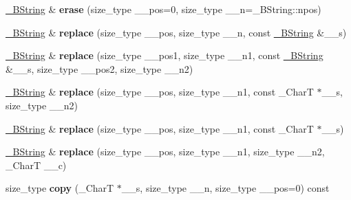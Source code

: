 \begin{DoxyCompactItemize}
\hyperlink{classbasic__string}{\+\_\+\+B\+String} \& {\bfseries erase} (size\+\_\+type \+\_\+\+\_\+pos=0, size\+\_\+type \+\_\+\+\_\+n=\+\_\+\+B\+String\+::npos)
\item 
\mbox{\label{class____bstr__sum_ae89e9ce3af93bc26c42b4db0bb301c82}} 
\hyperlink{classbasic__string}{\+\_\+\+B\+String} \& {\bfseries replace} (size\+\_\+type \+\_\+\+\_\+pos, size\+\_\+type \+\_\+\+\_\+n, const \hyperlink{classbasic__string}{\+\_\+\+B\+String} \&\+\_\+\+\_\+s)
\item 
\mbox{\label{class____bstr__sum_afd33aa7b835a24a603141171bce557f8}} 
\hyperlink{classbasic__string}{\+\_\+\+B\+String} \& {\bfseries replace} (size\+\_\+type \+\_\+\+\_\+pos1, size\+\_\+type \+\_\+\+\_\+n1, const \hyperlink{classbasic__string}{\+\_\+\+B\+String} \&\+\_\+\+\_\+s, size\+\_\+type \+\_\+\+\_\+pos2, size\+\_\+type \+\_\+\+\_\+n2)
\item 
\mbox{\label{class____bstr__sum_abdd6e076f57d44a71cd7277f724df418}} 
\hyperlink{classbasic__string}{\+\_\+\+B\+String} \& {\bfseries replace} (size\+\_\+type \+\_\+\+\_\+pos, size\+\_\+type \+\_\+\+\_\+n1, const \+\_\+\+CharT $\ast$\+\_\+\+\_\+s, size\+\_\+type \+\_\+\+\_\+n2)
\item 
\mbox{\label{class____bstr__sum_a5131eb6d7ba966b682341bb4ed85373a}} 
\hyperlink{classbasic__string}{\+\_\+\+B\+String} \& {\bfseries replace} (size\+\_\+type \+\_\+\+\_\+pos, size\+\_\+type \+\_\+\+\_\+n1, const \+\_\+\+CharT $\ast$\+\_\+\+\_\+s)
\item 
\mbox{\label{class____bstr__sum_ab42d77fb7e4e751636444e7fbcdcfd33}} 
\hyperlink{classbasic__string}{\+\_\+\+B\+String} \& {\bfseries replace} (size\+\_\+type \+\_\+\+\_\+pos, size\+\_\+type \+\_\+\+\_\+n1, size\+\_\+type \+\_\+\+\_\+n2, \+\_\+\+CharT \+\_\+\+\_\+c)
\item 
\mbox{\label{class____bstr__sum_a4f8f38b1fc7fdab7a92ee089c08a5619}} 
size\+\_\+type {\bfseries copy} (\+\_\+\+CharT $\ast$\+\_\+\+\_\+s, size\+\_\+type \+\_\+\+\_\+n, size\+\_\+type \+\_\+\+\_\+pos=0) const
\item 
\mbox{\label{class____bstr__sum_a82e308a9958669e5b33a36361b41b1b7}} 

\end{DoxyCompactItemize}
